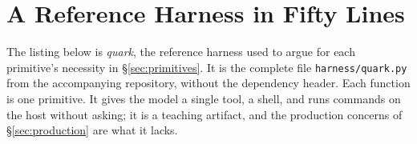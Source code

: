 \section{A Reference Harness in Fifty Lines}
\label{app:quark}

The listing below is \emph{quark}, the reference harness used to argue for each primitive's necessity in \S\ref{sec:primitives}. It is the complete file \texttt{harness/quark.py} from the accompanying repository, without the dependency header. Each function is one primitive. It gives the model a single tool, a shell, and runs commands on the host without asking; it is a teaching artifact, and the production concerns of \S\ref{sec:production} are what it lacks.


